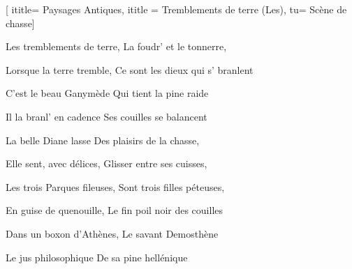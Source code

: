  [
ititle= {Paysages Antiques},
ititle = {Tremblements de terre (Les)},
tu=  {Scène de chasse}]


\beginverse
Les tremblements de terre,
La foudr' et le tonnerre,
\endverse

\beginverse
Lorsque la terre tremble,
Ce sont les dieux qui s' branlent
\endverse

\beginverse

C'est le beau Ganymède
Qui tient la pine raide
\endverse

\beginverse
Il la branl' en cadence
Ses couilles se balancent
\endverse

\beginverse
La belle Diane lasse
Des plaisirs de la chasse,
\endverse

\beginverse
Elle sent, avec délices,
Glisser entre ses cuisses,
\endverse

\beginverse
Les trois Parques fileuses,
Sont trois filles péteuses,
\endverse

\beginverse
En guise de quenouille,
Le fin poil noir des couilles
\endverse

\beginverse
Dans un boxon d'Athènes,
Le savant Demosthène
\endverse

\beginverse
Le jus philosophique
De sa pine hellénique
\endverse

\endsong
